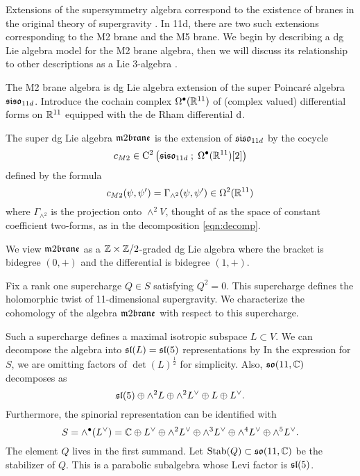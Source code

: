 \documentclass[11pt]{amsart}
\begin{document}

Extensions of the supersymmetry algebra correspond to the existence of branes in the original theory of supergravity . 
In 11d, there are two such extensions corresponding to the M2 brane and the M5 brane.
We begin by describing a dg Lie algebra model for the M2 brane algebra, then we will discuss its relationship to other descriptions as a Lie 3-algebra \cite{Basu_2005,Bagger_2007,fiorenza2015super}. 

The M2 brane algebra is dg Lie algebra extension of the super Poincar\'e algebra $\mathfrak{siso}_{11d}$.
Introduce the cochain complex $\Omega^{\bullet}(\mathbb R^{11})$ of (complex valued) differential forms on $\mathbb R^{11}$ equipped with the de Rham differential ${\rm d}$.  
 
The super dg Lie algebra $\m2$ is the extension of $\mathfrak{siso}_{11d}$ by the cocycle
  \[
    c_{M2} \in {\rm C}^2\left(\mathfrak{siso}_{11d} \; ; \; \Omega^\bullet (\mathbb R^{11})[2]\right)
  \]
  defined by the formula 
  \[c_{M2} (\psi, \psi') = \Gamma_{\wedge^2}(\psi, \psi') \in \Omega^2(\mathbb R^{11})\]
  where $\Gamma_{\wedge^2}$ is the projection onto $\wedge^2 V$, thought of as the space of constant coefficient two-forms, as in the decomposition \eqref{eqn:decomp}.

We view $\m2$ as a $\mathbb Z \times \mathbb Z/2$-graded dg Lie algebra where the bracket is bidegree $(0,+)$ and the differential is bidegree $(1,+)$.


Fix a rank one supercharge $Q \in S$ satisfying $Q^2 = 0$.
This supercharge defines the holomorphic twist of 11-dimensional supergravity. 
We characterize the cohomology of the algebra $\m2$ with respect to this supercharge. 

Such a supercharge defines a maximal isotropic subspace $L \subset V$. 
We can decompose the algebra into $\mathfrak{sl}(L) = \mathfrak{sl}(5)$ representations by
In the expression for $S$, we are omitting factors of $\det(L)^{\frac12}$ for simplicity. 
Also, $\mathfrak{so}(11, \mathbb C)$ decomposes as
\[
\mathfrak{sl}(5) \oplus \wedge^2 L \oplus \wedge^2 L^\vee \oplus L \oplus L^\vee .
\]
Furthermore, the spinorial representation can be identified with
\[
S = \wedge^\bullet (L^\vee) = \mathbb C \oplus L^\vee \oplus \wedge^2 L^\vee \oplus \wedge^3 L^\vee \oplus \wedge^4 L^\vee \oplus \wedge^5 L^\vee .
\]
The element $Q$ lives in the first summand.
Let ${\rm Stab}(Q) \subset \mathfrak{so}(11,\mathbb C)$ be the stabilizer of $Q$. 
This is a parabolic subalgebra whose Levi factor is $\mathfrak{sl}(5)$.
\end{document}
